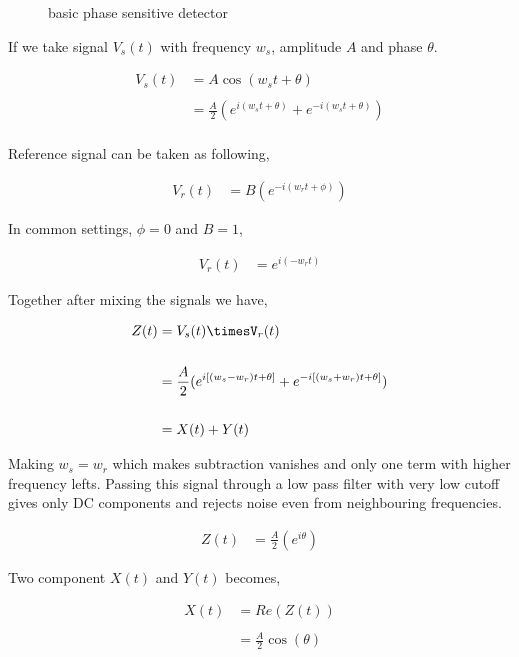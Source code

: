 \documentclass[12pt]{article}
\begin{document}
\begin{figure}[hbt!]
\caption{basic phase sensitive detector}
\end{figure}

If we take signal $V_s(t)$ with frequency $w_s$, amplitude $A$ and phase $\theta$. 

\begin{align*}
V_{s}(t) & = A \cos(w_st+\theta)\\
\\
& = \frac{A}{2} (e^{i(w_st+\theta)}+e^{-i(w_st+\theta)})\\
\end{align*}

Reference signal can be taken as following,

\begin{align*}
V_r(t) & = B (e^{-i(w_rt+\phi)})
\end{align*}

In common settings, $\phi = 0$ and $B=1$,

\begin{align*}
V_r(t) & = e^{i(-w_rt)}
\end{align*}

Together after mixing the signals we have,

\begin{align*}
Z(t) & = V_s(t)\timesV_r(t)\\
\\
& = \frac{A}{2}(e^{i\left[ (w_s-w_r)t+\theta \right]}+e^{-i\left[ (w_s+w_r)t+\theta \right]})\\
\\
& = X(t)+Y(t)
\end{align*}

Making $w_s=w_r$ which makes subtraction vanishes and only one term with higher frequency lefts. Passing this signal through a low pass filter with very low cutoff gives only DC components and rejects noise even from neighbouring frequencies.


\begin{align*}
Z(t) & = \frac{A}{2}(e^{i \theta})
\end{align*}

Two component $X(t)$ and $Y(t)$ becomes,

\begin{align*}
X(t) & =Re(Z(t))\\
\\
& =  \frac{A}{2}\cos(\theta)
\end{align*}
\end{document}
